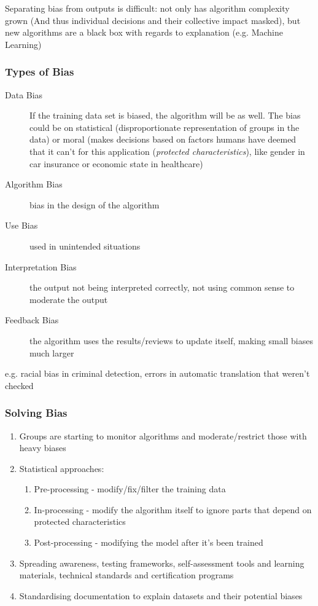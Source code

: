 Separating bias from outputs is difficult: not only has algorithm complexity grown (And thus individual decisions and their collective impact masked), but new algorithms are a black box with regards to explanation (e.g. Machine Learning) 

 
 \subsubsection{Types of Bias}
 \begin{description}
    \item[Data Bias] If the training data set is biased, the algorithm will be as well. The bias could be on statistical (disproportionate representation of groups in the data) or moral (makes decisions based on factors humans have deemed that it can't for this application (\emph{protected characteristics}), like gender in car insurance or economic state in healthcare)
    \item[Algorithm Bias] bias in the design of the algorithm
    \item[Use Bias] used in unintended situations 
    \item [Interpretation Bias] the output not being interpreted correctly, not using common sense to moderate the output
    \item[Feedback Bias] the algorithm uses the results/reviews to update itself, making small biases much larger
 \end{description} 
 e.g. racial bias in criminal detection, errors in automatic translation that weren't checked
 
 \subsubsection{Solving Bias}
 \begin{enumerate}
     \item Groups are starting to monitor algorithms and moderate/restrict those with heavy biases
     \item Statistical approaches:
     \begin{enumerate}
         \item Pre-processing - modify/fix/filter the training data
         \item In-processing - modify the algorithm itself to ignore parts that depend on protected characteristics
         \item Post-processing - modifying the model after it's been trained
     \end{enumerate}
     \item Spreading awareness, testing frameworks, self-assessment tools and learning materials, technical standards and certification programs
     \item Standardising documentation to explain datasets and their potential biases 
 \end{enumerate}
 
 